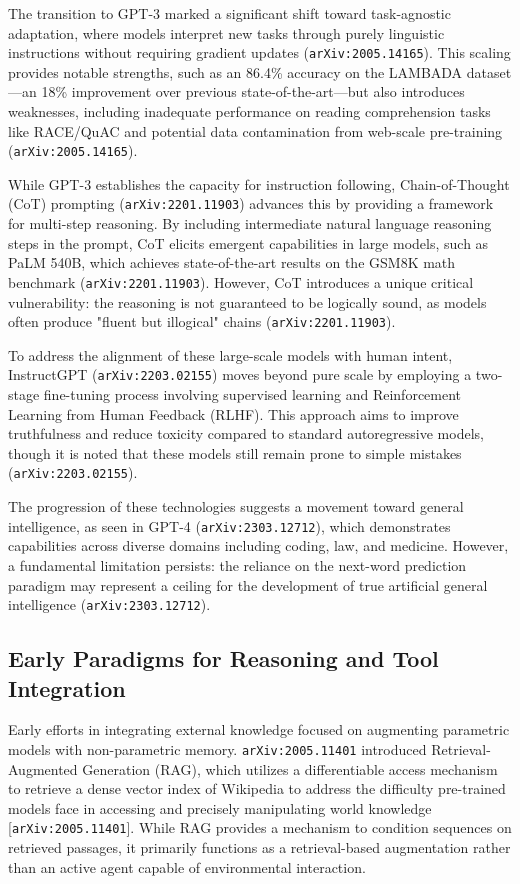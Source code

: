\documentclass[11pt]{article}
\begin{document}
The transition to GPT-3 marked a significant shift toward task-agnostic adaptation, where models interpret new tasks through purely linguistic instructions without requiring gradient updates (\texttt{arXiv:2005.14165}). This scaling provides notable strengths, such as an 86.4\% accuracy on the LAMBADA dataset—an 18\% improvement over previous state-of-the-art—but also introduces weaknesses, including inadequate performance on reading comprehension tasks like RACE/QuAC and potential data contamination from web-scale pre-training (\texttt{arXiv:2005.14165}).

While GPT-3 establishes the capacity for instruction following, Chain-of-Thought (CoT) prompting (\texttt{arXiv:2201.11903}) advances this by providing a framework for multi-step reasoning. By including intermediate natural language reasoning steps in the prompt, CoT elicits emergent capabilities in large models, such as PaLM 540B, which achieves state-of-the-art results on the GSM8K math benchmark (\texttt{arXiv:2201.11903}). However, CoT introduces a unique critical vulnerability: the reasoning is not guaranteed to be logically sound, as models often produce "fluent but illogical" chains (\texttt{arXiv:2201.11903}).

To address the alignment of these large-scale models with human intent, InstructGPT (\texttt{arXiv:2203.02155}) moves beyond pure scale by employing a two-stage fine-tuning process involving supervised learning and Reinforcement Learning from Human Feedback (RLHF). This approach aims to improve truthfulness and reduce toxicity compared to standard autoregressive models, though it is noted that these models still remain prone to simple mistakes (\texttt{arXiv:2203.02155}).

The progression of these technologies suggests a movement toward general intelligence, as seen in GPT-4 (\texttt{arXiv:2303.12712}), which demonstrates capabilities across diverse domains including coding, law, and medicine. However, a fundamental limitation persists: the reliance on the next-word prediction paradigm may represent a ceiling for the development of true artificial general intelligence (\texttt{arXiv:2303.12712}).

\subsection{Early Paradigms for Reasoning and Tool Integration}

Early efforts in integrating external knowledge focused on augmenting parametric models with non-parametric memory. \texttt{arXiv:2005.11401} introduced Retrieval-Augmented Generation (RAG), which utilizes a differentiable access mechanism to retrieve a dense vector index of Wikipedia to address the difficulty pre-trained models face in accessing and precisely manipulating world knowledge [\texttt{arXiv:2005.11401}]. While RAG provides a mechanism to condition sequences on retrieved passages, it primarily functions as a retrieval-based augmentation rather than an active agent capable of environmental interaction.
\end{document}
